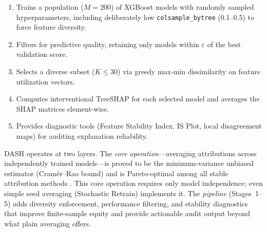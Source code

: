 \documentclass[11pt]{article}
\newcommand{\dash}{\textsc{DASH}}
\begin{document}
\begin{enumerate}
  \item Trains a population ($M = 200$) of XGBoost models with
    randomly sampled hyperparameters, including deliberately low
    \texttt{colsample\_bytree} (0.1--0.5) to force feature diversity.
  \item Filters for predictive quality, retaining only models within
    $\varepsilon$ of the best validation score.
  \item Selects a diverse subset ($K \leq 30$) via greedy max-min
    dissimilarity on feature utilization vectors.
  \item Computes interventional TreeSHAP for each selected model and
    averages the SHAP matrices element-wise.
  \item Provides diagnostic tools (Feature Stability Index, IS Plot,
    local disagreement maps) for auditing explanation reliability.
\end{enumerate}

\noindent \dash{} operates at two layers.
The \emph{core operation}---averaging attributions across independently
trained models---is proved to be the minimum-variance unbiased
estimator (Cram\'er--Rao bound) and is Pareto-optimal among all stable
attribution methods \citep{caraker2026impossibility}.  This core
operation requires only model independence; even simple seed averaging
(Stochastic Retrain) implements it.
The \emph{pipeline} (Stages~1--5) adds diversity enforcement,
performance filtering, and stability diagnostics that improve
finite-sample equity and provide actionable audit output beyond what
plain averaging offers.
\end{document}
